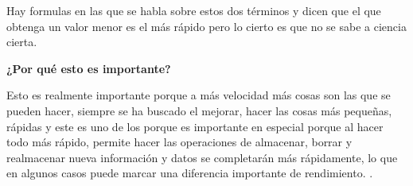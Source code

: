 \documentclass{article}
\begin{document}
Hay formulas en las que se habla sobre estos dos términos y dicen que el que obtenga un valor menor es el más rápido pero lo cierto es que no se sabe a ciencia cierta.

    \vspace{0.8cm}
    
        \textbf{¿Por qué esto es importante?}
        
    \vspace{0.8cm}
    Esto es realmente importante porque a más velocidad más cosas son las que se pueden hacer, siempre se ha buscado el mejorar, hacer las cosas más pequeñas, rápidas y este es uno de los porque es importante en especial porque al hacer todo más rápido, permite hacer las  operaciones de almacenar, borrar y realmacenar nueva información y datos se completarán más rápidamente, lo que en algunos casos puede marcar una diferencia importante de rendimiento. \citep{RAMLA}.
\newline

\medskip

\end{document}
